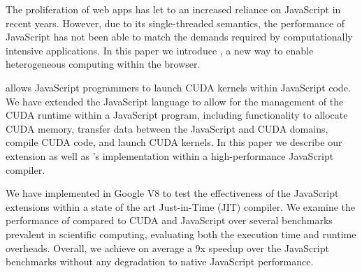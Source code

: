 
The proliferation of web apps has let to an increased reliance on JavaScript in
recent years. However, due to its single-threaded semantics, the performance of
JavaScript has not been able to match the demands required by computationally
intensive applications. In this paper we introduce \namens, a new way to enable
heterogeneous computing within the browser.

\name allows JavaScript programmers to launch CUDA kernels within JavaScript
code. We have extended the JavaScript language to allow for the management of
the CUDA runtime within a JavaScript program, including functionality to
allocate CUDA memory, transfer data between the JavaScript and CUDA domains,
compile CUDA code, and launch CUDA kernels. In this paper we describe our
extension as well as \namens's implementation within a high-performance
JavaScript compiler.

We have implemented \name in Google V8 to test the
effectiveness of the JavaScript extensions within a state of the art
Just-in-Time (JIT) compiler. We examine the performance of \name compared to
CUDA and JavaScript over several benchmarks prevalent in scientific computing,
evaluating both the execution time and runtime overheads.  Overall, we achieve
on average a 9x speedup over the JavaScript benchmarks without any degradation
to native JavaScript performance.

